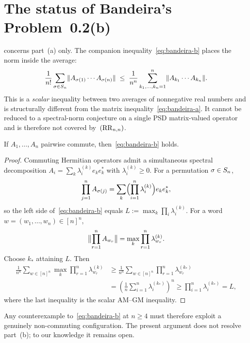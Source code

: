 \section{The status of Bandeira's Problem~0.2(b)}\label{sec:partb}

 concerns part~(a) only.  The companion
inequality~\eqref{eq:bandeira-b} places the norm inside the average:
\[
  \frac{1}{n!}\sum_{\sigma\in\Sn}
    \opnorm{A_{\sigma(1)}\cdots A_{\sigma(n)}}
  \;\le\;
  \frac{1}{n^n}\sum_{k_1,\dots,k_n=1}^{n}
    \opnorm{A_{k_1}\cdots A_{k_n}}.
\]
This is a \emph{scalar} inequality between two averages of
nonneg\-ative real numbers and is structurally different from the
matrix inequality~\eqref{eq:bandeira-a}.  It cannot be reduced to a
spectral-norm conjecture on a single PSD matrix-valued operator and
is therefore not covered by~$(\RR_{n,n})$.

\begin{lemma}\label{lem:commuting}
If $A_1,\dots,A_n$ pairwise commute, then~\eqref{eq:bandeira-b} holds.
\end{lemma}

\begin{proof}
Commuting Hermitian operators admit a simultaneous spectral
decomposition $A_i = \sum_k \lambda_i^{(k)} e_k e_k^{*}$ with
$\lambda_i^{(k)}\ge 0$.  For a permutation $\sigma\in\Sn$,
\[
  \prod_{j=1}^{n} A_{\sigma(j)}
  =\sum_k\Bigl(\prod_{i=1}^{n}\lambda_i^{(k)}\Bigr)e_k e_k^{*},
\]
so the left side of~\eqref{eq:bandeira-b} equals
$L:=\max_k\prod_i\lambda_i^{(k)}$.  For a word
$w=(w_1,\dots,w_n)\in[n]^n$,
\[
  \opnorm[\big]{\prod_{r=1}^{n}A_{w_r}}
  =\max_k\prod_{r=1}^{n}\lambda_{w_r}^{(k)}.
\]
Choose $k_*$ attaining $L$.  Then
\begin{align*}
  \frac{1}{n^n}\sum_{w\in[n]^n}
    \max_k\prod_{r=1}^{n}\lambda_{w_r}^{(k)}
  &\ge
  \frac{1}{n^n}\sum_{w\in[n]^n}
    \prod_{r=1}^{n}\lambda_{w_r}^{(k_*)} \\
  &=\left(\frac{1}{n}\sum_{i=1}^{n}\lambda_i^{(k_*)}\right)^{\!n}
  \ge \prod_{i=1}^{n}\lambda_i^{(k_*)}=L,
\end{align*}
where the last inequality is the scalar AM--GM inequality.
\end{proof}

Any counterexample to~\eqref{eq:bandeira-b} at $n\ge 4$ must
therefore exploit a genuinely non-commuting configuration.
The present argument does not resolve part~(b); to our knowledge
it remains open.

